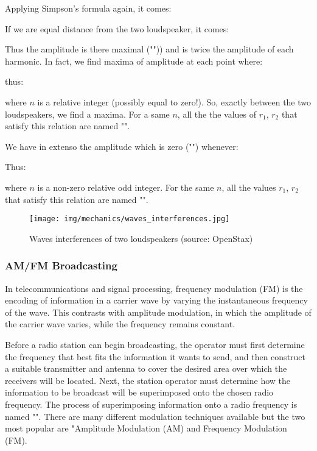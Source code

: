 	Applying Simpson's formula again, it comes:
	
	If we are equal distance from the two loudspeaker, it comes:
	
	Thus the amplitude is there maximal ("")) and is twice the amplitude of each harmonic. In fact, we find maxima of amplitude at each point where:
	
	thus:
	
	where $n$ is a relative integer (possibly equal to zero!). So, exactly between the two loudspeakers, we find a maxima. For a same $n$, all the the values of $r_1$, $r_2$ that satisfy this relation are named "".
	
	We have in extenso the amplitude which is zero ("") whenever:
	
	Thus:
	
	where $n$ is a non-zero relative odd integer. For the same $n$, all the values $r_1$, $r_2$ that satisfy this relation are named "".
	\begin{figure}[H]
		\centering
		\texttt{[image: img/mechanics/waves\_interferences.jpg]}
		\caption{Waves interferences of two loudspeakers (source: OpenStax)}
	\end{figure}
	
	\subsubsection{AM/FM Broadcasting}
	In telecommunications and signal processing, frequency modulation (FM) is the encoding of information in a carrier wave by varying the instantaneous frequency of the wave. This contrasts with amplitude modulation, in which the amplitude of the carrier wave varies, while the frequency remains constant.
	
	Before a radio station can begin broadcasting, the operator must first determine the frequency that best fits the information it wants to send, and then construct a suitable transmitter and antenna to cover the desired area over which the receivers will be located.  Next, the station operator must determine how the information to be broadcast will be superimposed onto the chosen radio frequency.  The process of superimposing information onto a radio frequency is named "".  There are many different modulation techniques available but the two most popular are "Amplitude Modulation (AM) and Frequency Modulation (FM).

